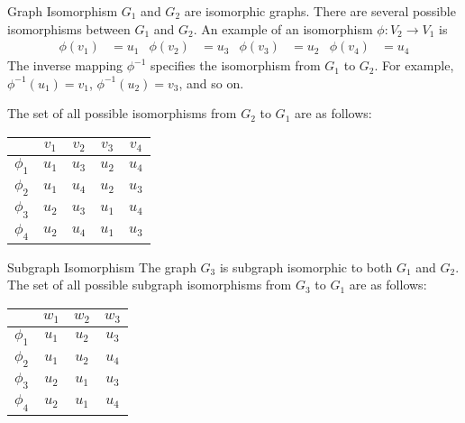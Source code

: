 \begin{frame}{Graph Isomorphism}
$G_1$
and $G_2$ are isomorphic graphs. There are several possible
isomorphisms between $G_1$ and $G_2$. An example of
an isomorphism $\phi: V_2 \to V_1$ is
\begin{align*}
  \phi(v_1) & = u_1 & \phi(v_2) &= u_3 & \phi(v_3) & = u_2 &
  \phi(v_4) & = u_4
\end{align*}
The inverse mapping $\phi^{-1}$ specif\/{i}es the isomorphism from $G_1$
to $G_2$. For example, $\phi^{-1}(u_1) = v_1$,
$\phi^{-1}(u_2) = v_3$, and so on.

\bigskip
The set of all possible isomorphisms from $G_2$ to $G_1$ are as
follows:
\begin{center}
\begin{tabular}{c|cccc}
  & $v_1$ & $v_2$ & $v_3$ & $v_4$\\
  \hline
  $\phi_1$ & $u_1$ & $u_3$ & $u_2$ & $u_4$\\
  $\phi_2$ & $u_1$ & $u_4$ & $u_2$ & $u_3$\\
  $\phi_3$ & $u_2$ & $u_3$ & $u_1$ & $u_4$\\
  $\phi_4$ & $u_2$ & $u_4$ & $u_1$ & $u_3$
\end{tabular}
\end{center}
\end{frame}

\begin{frame}{Subgraph Isomorphism}
The graph $G_3$ is subgraph isomorphic to
both $G_1$ and $G_2$. The set of all possible subgraph
isomorphisms from $G_3$ to $G_1$ are as follows:
\begin{center}
\begin{tabular}{c|ccc}
  & $w_1$ & $w_2$ & $w_3$\\
  \hline
  $\phi_1$ & $u_1$ & $u_2$ & $u_3$\\
  $\phi_2$ & $u_1$ & $u_2$ & $u_4$\\
  $\phi_3$ & $u_2$ & $u_1$ & $u_3$\\
  $\phi_4$ & $u_2$ & $u_1$ & $u_4$\\
\end{tabular}
\end{center}

\end{frame}


